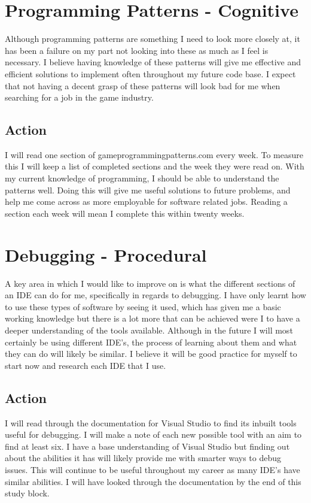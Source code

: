 \documentclass{scrartcl}
\begin{document}
\section{Programming Patterns - Cognitive}
Although programming patterns are something I need to look more closely at, it has been a failure on my part not looking into these as much as I feel is necessary. I believe having knowledge of these patterns will give me effective and efficient solutions to implement often throughout my future code base. I expect that not having a decent grasp of these patterns will look bad for me when searching for a job in the game industry.
\subsection{Action}
I will read one section of gameprogrammingpatterns.com every week. To measure this I will keep a list of completed sections and the week they were read on. With my current knowledge of programming, I should be able to understand the patterns well. Doing this will give me useful solutions to future problems, and help me come across as more employable for software related jobs. Reading a section each week will mean I complete this within twenty weeks.

\section{Debugging - Procedural}
A key area in which I would like to improve on is what the different sections of an IDE can do for me, specifically in regards to debugging. I have only learnt how to use these types of software by seeing it used, which has given me a basic working knowledge but there is a lot more that can be achieved were I to have a deeper understanding of the tools available. Although in the future I will most certainly be using different IDE's, the process of learning about them and what they can do will likely be similar. I believe it will be good practice for myself to start now and research each IDE that I use.
\subsection{Action}
I will read through the documentation for Visual Studio to find its inbuilt tools useful for debugging. I will make a note of each new possible tool with an aim to find at least six. I have a base understanding of Visual Studio but finding out about the abilities it has will likely provide me with smarter ways to debug issues. This will continue to be useful throughout my career as many IDE's have similar abilities. I will have looked through the documentation by the end of this study block.
\end{document}
